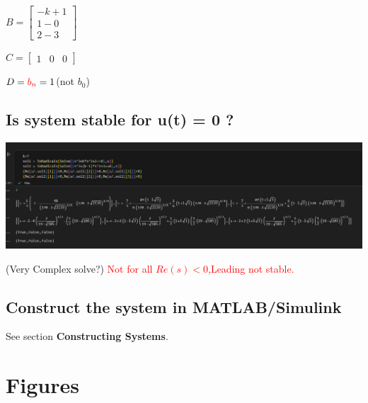 \documentclass[12pt,a4paper,oneside]{ctexart}
\begin{document}
    $B = \begin{bmatrix}
        -k+1\\
        1-0\\
        2-3
    \end{bmatrix}$

    $C = \begin{bmatrix}
        1&0&0
    \end{bmatrix}$

    $D = \textcolor{red}{b_n} = 1$(not $b_0$)

    \subsection{Is system stable for u(t) = 0 ?}
    \includegraphics[width = 0.8\linewidth]{../screenshots/SystemStable.PNG}
    
    (Very Complex solve?)
    \textcolor{red}{Not for all $Re(s)<0$,Leading not stable.}
    \subsection{Construct the system in MATLAB/Simulink}
    See section \textbf{Constructing Systems}.

    \section{Figures}
\end{document}
